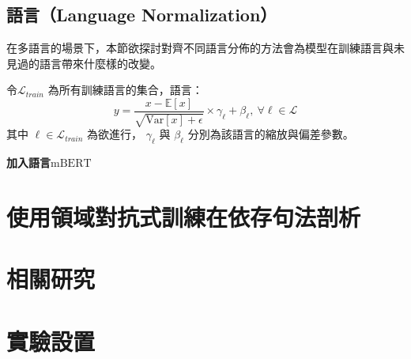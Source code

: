 \subsection{語言\XNorm（Language Normalization）}
在多語言的場景下，本節欲探討對齊不同語言分佈的方法會為模型在訓練語言與未見過的語言帶來什麼樣的改變。

令$\mathcal{L}_{train}$ 為所有訓練語言的集合，語言：
\begin{equation}
    y = \frac{x - \mathbb{E}[x]}{\sqrt{\textrm{Var}[x] + \epsilon}}
    \times \gamma_{\ell} + \beta_{\ell},\ \forall \ell \in \mathcal{L}
\end{equation}
其中 $\ell \in \mathcal{L}_{train}$ 為欲進行， $\gamma_{\ell}$ 與 $\beta_{\ell}$ 分別為該語言的縮放與偏差參數。


\vspace{12pt}
\noindent\textbf{加入語言$\mathrm{mBERT}$}
\vspace{4pt}

\section{使用領域對抗式訓練在依存句法剖析}

\section{相關研究}
\section{實驗設置}
